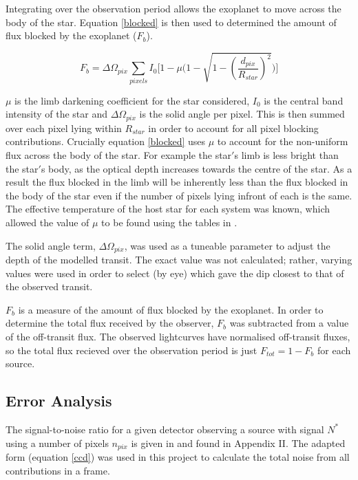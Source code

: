 \documentclass{report}
\begin{document}
Integrating over the observation period allows the exoplanet to move across the body of the star. Equation \ref{blocked} is then used to determined the amount of flux blocked by the exoplanet ($F_{b}$). 

\begin{equation} \label{blocked}
    F_{b} = \Delta \Omega_{pix} \sum_{pixels} I_{0}\Bigg[1-\mu\Bigg(1-\sqrt{1-\left(\frac{d_{pix}}{R_{star}}\right)^{2}}\Bigg)\Bigg]
\end{equation}

$\mu$ is the limb darkening coefficient for the star considered, $I_{0}$ is the central band intensity of the star and $\Delta\Omega_{pix}$ is the solid angle per pixel. This is then summed over each pixel lying within $R_{star}$ in order to account for all pixel blocking contributions. Crucially equation \ref{blocked} uses $\mu$ to account for the non-uniform flux across the body of the star. For example the star$'$s limb is less bright than the star$'$s body, as the optical depth increases towards the centre of the star. As a result the flux blocked in the limb will be inherently less than the flux blocked in the body of the star even if the number of pixels lying infront of each is the same. The effective temperature of the host star for each system was known, which allowed the value of $\mu$ to be found using the tables in \textcite{vanhamme}.

The solid angle term, $\Delta \Omega_{pix}$, was used as a tuneable parameter to adjust the depth of the modelled transit. The exact value was not calculated; rather, varying values were used in order to select (by eye) which gave the dip closest to that of the observed transit.

$F_{b}$ is a measure of the amount of flux blocked by the exoplanet. In order to determine the total flux received by the observer, $F_{b}$ was subtracted from a value of the off-transit flux. The observed lightcurves have normalised off-transit fluxes, so the total flux recieved over the observation period is just $F_{tot} = 1 - F_{b}$ for each source. 

\subsection{Error Analysis}
The signal-to-noise ratio for a given detector observing a source with signal $N^{*}$ using a number of pixels $n_{pix}$ is given in \textcite{howell} and found in Appendix II. The adapted form (equation \ref{ccd}) was used in this project to calculate the total noise from all contributions in a frame.
\end{document}
